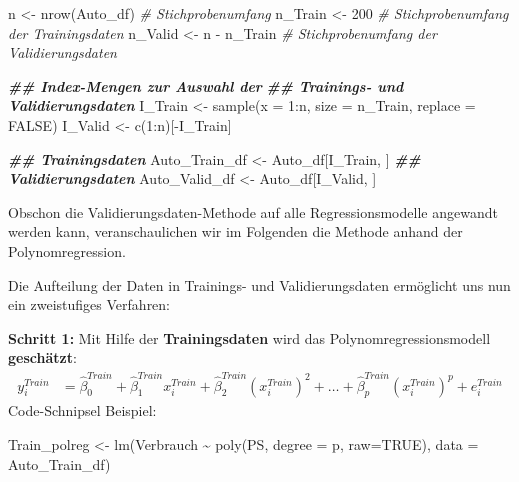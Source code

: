 \documentclass[
  ngerman,
]{book}
\newenvironment{Shaded}{\begin{snugshade}}{\end{snugshade}}
\newcommand{\AttributeTok}[1]{\textcolor[rgb]{0.77,0.63,0.00}{#1}}
\newcommand{\CommentTok}[1]{\textcolor[rgb]{0.56,0.35,0.01}{\textit{#1}}}
\newcommand{\ConstantTok}[1]{\textcolor[rgb]{0.00,0.00,0.00}{#1}}
\newcommand{\DecValTok}[1]{\textcolor[rgb]{0.00,0.00,0.81}{#1}}
\newcommand{\DocumentationTok}[1]{\textcolor[rgb]{0.56,0.35,0.01}{\textbf{\textit{#1}}}}
\newcommand{\FunctionTok}[1]{\textcolor[rgb]{0.00,0.00,0.00}{#1}}
\newcommand{\NormalTok}[1]{#1}
\newcommand{\OtherTok}[1]{\textcolor[rgb]{0.56,0.35,0.01}{#1}}
\newcommand{\SpecialCharTok}[1]{\textcolor[rgb]{0.00,0.00,0.00}{#1}}
\begin{document}
\begin{Shaded}
\begin{Highlighting}[]
\NormalTok{n        }\OtherTok{\textless{}{-}} \FunctionTok{nrow}\NormalTok{(Auto\_df) }\CommentTok{\# Stichprobenumfang}
\NormalTok{n\_Train  }\OtherTok{\textless{}{-}} \DecValTok{200}           \CommentTok{\# Stichprobenumfang der Trainingsdaten}
\NormalTok{n\_Valid  }\OtherTok{\textless{}{-}}\NormalTok{ n }\SpecialCharTok{{-}}\NormalTok{ n\_Train   }\CommentTok{\# Stichprobenumfang der Validierungsdaten}

\DocumentationTok{\#\# Index{-}Mengen zur Auswahl der }
\DocumentationTok{\#\# Trainings{-} und Validierungsdaten}
\NormalTok{I\_Train  }\OtherTok{\textless{}{-}} \FunctionTok{sample}\NormalTok{(}\AttributeTok{x =} \DecValTok{1}\SpecialCharTok{:}\NormalTok{n, }\AttributeTok{size =}\NormalTok{ n\_Train, }\AttributeTok{replace =} \ConstantTok{FALSE}\NormalTok{)}
\NormalTok{I\_Valid  }\OtherTok{\textless{}{-}} \FunctionTok{c}\NormalTok{(}\DecValTok{1}\SpecialCharTok{:}\NormalTok{n)[}\SpecialCharTok{{-}}\NormalTok{I\_Train]}

\DocumentationTok{\#\# Trainingsdaten }
\NormalTok{Auto\_Train\_df }\OtherTok{\textless{}{-}}\NormalTok{ Auto\_df[I\_Train, ]}
\DocumentationTok{\#\# Validierungsdaten }
\NormalTok{Auto\_Valid\_df }\OtherTok{\textless{}{-}}\NormalTok{ Auto\_df[I\_Valid, ]}
\end{Highlighting}
\end{Shaded}

Obschon die Validierungsdaten-Methode auf alle Regressionsmodelle angewandt werden kann, veranschaulichen wir im Folgenden die Methode anhand der Polynomregression.

Die Aufteilung der Daten in Trainings- und Validierungsdaten ermöglicht uns nun ein zweistufiges Verfahren:

\textbf{Schritt 1:} Mit Hilfe der \textbf{Trainingsdaten} wird das Polynomregressionsmodell \textbf{geschätzt}:
\begin{align*}
y^{Train}_i
&=\hat{\beta}_0^{Train} + \hat{\beta}_1^{Train} x_{i}^{Train} + \hat{\beta}_2^{Train} (x_{i}^{Train})^2 + \dots + \hat{\beta}_p^{Train} (x_{i}^{Train})^p + e_i^{Train}
\end{align*}
Code-Schnipsel Beispiel:

\begin{Shaded}
\begin{Highlighting}[]
\NormalTok{Train\_polreg }\OtherTok{\textless{}{-}} \FunctionTok{lm}\NormalTok{(Verbrauch }\SpecialCharTok{\textasciitilde{}} \FunctionTok{poly}\NormalTok{(PS, }\AttributeTok{degree =}\NormalTok{ p, }\AttributeTok{raw=}\ConstantTok{TRUE}\NormalTok{), }\AttributeTok{data =}\NormalTok{ Auto\_Train\_df)}
\end{Highlighting}
\end{Shaded}
\end{document}
